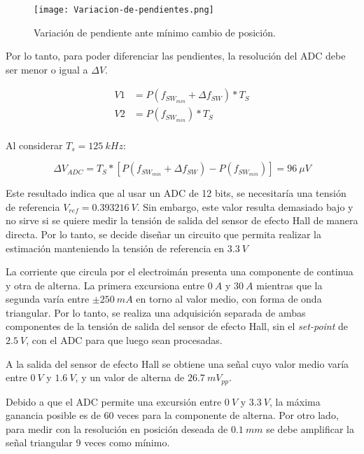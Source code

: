 \begin{figure}[H]
	\centering
	\texttt{[image: Variacion-de-pendientes.png]}
	\caption{Variación de pendiente ante mínimo cambio de posición.}
	\label{fig:variacion-de-pendiente}
\end{figure}

\noindent Por lo tanto, para poder diferenciar las pendientes, la resolución del ADC debe ser menor o igual a $\Delta V$.

\begin{equation} 
	\begin{aligned}
		V1 &= P(f_{SW_{min}} + \Delta f_{SW})* T_S \\
		V2 &= P(f_{SW_{min}})* T_S \\		 
	\end{aligned}
\end{equation}

\noindent Al considerar $T_s = 125\:kHz$:

\begin{equation} 
	\Delta V_{ADC} = T_S * [P(f_{SW_{min}} + \Delta f_{SW}) - P(f_{SW_{min}})] = 96\:\mu V
\end{equation}



\noindent Este resultado indica que al usar un ADC de 12 bits, se necesitaría una tensión de referencia $V_{ref} = 0.393216\:V$. Sin embargo, este valor resulta demasiado bajo y no sirve si se quiere medir la tensión de salida del sensor de efecto Hall de manera directa. Por lo tanto, se decide diseñar un circuito que permita realizar la estimación manteniendo la tensión de referencia en $3.3\:V$

\noindent La corriente que circula por el electroimán presenta una componente de continua y otra de alterna. La primera excursiona entre $0\:A$ y $30\:A$ mientras que la segunda varía entre $\pm 250\:mA$ en torno al valor medio, con forma de onda triangular. Por lo tanto, se realiza una adquisición separada de ambas componentes de la tensión de salida del sensor de efecto Hall, sin el \textsl{set-point} de $2.5\:V$, con el ADC para que luego sean procesadas.

\noindent A la  salida del sensor de efecto Hall se obtiene una señal cuyo valor medio varía entre $0\:V$ y $1.6\:V$, y un valor de alterna de $26.7\:mV_{pp}$.

\noindent Debido a que el ADC permite una excursión entre $0\:V$ y $3.3\:V$, la máxima ganancia posible es de 60 veces para la componente de alterna. Por otro lado, para medir con la resolución en posición deseada de $0.1\:mm$ se debe amplificar la señal triangular 9 veces como mínimo.

